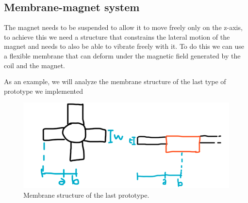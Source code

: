 \subsection{Membrane-magnet system}
\label{sec: Membrane-magnet_system}

The magnet needs to be suspended to allow it to move freely only on the z-axis, to achieve this we need a structure that constrains the lateral motion of the magnet and needs to also be able to vibrate freely with it.
To do this we can use a flexible membrane that can deform under the magnetic field generated by the coil and the magnet. 

As an example, we will analyze the membrane structure of the last type of prototype we implemented %
\begin{figure}
    \centering
    \includegraphics[scale=0.4]{Chapters/Chapter2/Modelling_of_Entire_System/Figures/membrane.png} %
    \caption[Membrane structure]{Membrane structure of the last prototype.}
    \label{fig:Membrane_structure}
\end{figure}

